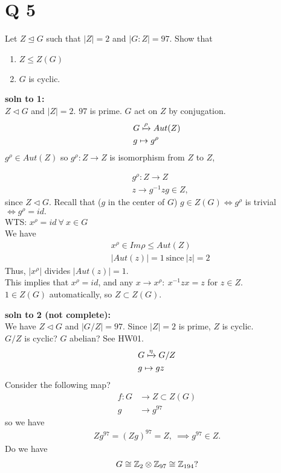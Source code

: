 \documentclass[12pt,english]{article}
\begin{document}
\section*{Q 5}
\begin{proposition}
    Let $Z \trianglelefteq G$ such that $ \lvert Z \rvert = 2$ and $ \lvert G:Z \rvert =97 $. Show that
    \begin{enumerate}
        \item $Z \leq Z(G)$
        \item $G$ is cyclic.
    \end{enumerate}
    
\end{proposition}

\textbf{soln to 1:}\\
$Z \triangleleft G$ and $|Z| = 2$. $97$ is prime. $G$ act on $Z$ by conjugation.
\begin{align}
    &G \xmapsto{\rho} Aut(Z)\\
    &g \mapsto g^{\rho}
\end{align}
$g^{\rho} \in Aut(Z)$ so $g^{\rho}: Z \rightarrow Z$ is isomorphism from $Z$ to $Z$, 

\begin{align}
    & g^{\rho}: Z \rightarrow Z\\
    & z \rightarrow g^{-1} z g \in Z, 
\end{align} since $Z \triangleleft G$.
Recall that ($g$ in the center of $G$) $g \in Z(G) \iff g^{\rho}$ is trivial $\iff g^{\rho} = id.$  \\
WTS: $x^{\rho} = id \ \forall \ x \in G$ \\
We have
\begin{align}
    & x^{\rho} \in Im \rho \leq Aut(Z) \\
    & |Aut(z)| = 1 \ \text{since} \ |z|=2
\end{align}
Thus, $|x^{\rho}|$ divides $|Aut(z)|=1$.\\
This implies that $x^{\rho} = id$, and any $x \rightarrow x^{\rho}: \ x^{-1} z x = z$ for $z \in Z$.\\
$1 \in Z(G)$ automatically, so $Z \subset Z(G)$.

\textbf{soln to 2 (not complete):}\\
We have $Z \triangleleft G$ and $|G/Z| = 97$. Since $|Z|=2$ is prime, $Z$ is cyclic.\\
$G/Z$ is cyclic? $G$ abelian? See HW01.
\begin{align}
    & G \xmapsto{\eta} G/Z\\
    & g \mapsto gz
\end{align}
Consider the following map?
\begin{align}
    f: G &\rightarrow Z \subset Z(G)\\
    g &\rightarrow g^{97}
\end{align}
so we have 
\begin{align}
    Z g^{97} = (Z g)^{97} = Z, \ \implies g^{97} \in Z.
\end{align}
Do we have 
\begin{align}
    G \cong \mathbb{Z}_2 \otimes \mathbb{Z}_{97} \cong \mathbb{Z}_{194} ?
\end{align}
\end{document}
